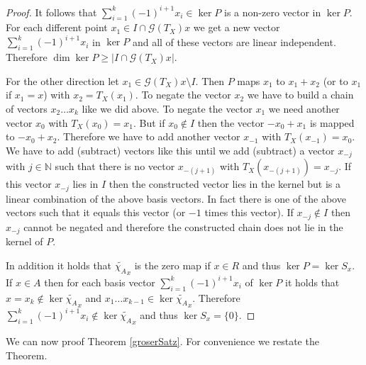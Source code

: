 \documentclass[12pt,a4paper]{scrartcl}
\theoremstyle{plain}
\theoremstyle{definition}
\newcommand{\N}{\mathbb{N}} %
\newcommand{\2}{\mathbb{Z} / 2 \mathbb{Z}}
\newcommand{\G}{\mathcal{G}}
\newcommand{\1}{\bar{1}}
\newcommand{\0}{\bar{0}}
\begin{document}
\begin{proof}
	It follows that $\sum_{i = 1}^{k} (-1)^{i + 1} x_i \in \ker P$ is a non-zero vector in $ \ker P$. For each different point $x_1 \in  I \cap \G (T_X)x$ we get a new vector $\sum_{i = 1}^{k} (-1)^{i + 1} x_i$ in $\ker P$ and all of these vectors are linear independent. Therefore $\dim \ker P \ge |I \cap \G (T_X)x| $.
	
	For the other direction let $x_1 \in \G (T_X)x \setminus I$. Then $P$ maps $x_1$ to $x_1 + x_2$ (or to $x_1$ if $x_1=x$) with $x_2 = T_X(x_1)$. To negate the vector $x_2$  we have to build a chain of vectors $x_2 \ldots x_k$ like we did above. To negate the vector $x_1$ we need another vector $x_0$ with $T_X(x_0) = x_1$. But if $x_0 \notin I$ then the vector $-x_0 + x_1$ is mapped to $-x_0 + x_2$. Therefore we have to add another vector $x_{-1}$ with $T_X(x_{-1}) = x_0$. We have to add (subtract) vectors like this until we add (subtract) a vector $x_{-j}$ with $j \in \N$ such that there is no vector $x_{-(j+1)}$ with $T_X(x_{-(j+1)}) = x_{-j}$. If this vector $x_{-j}$ lies in $I$ then the constructed vector lies in the kernel but is a linear combination of the above basis vectors. In fact there is one of the above vectors such that it equals this vector (or $-1$ times this vector). If $x_{-j} \notin I$ then $x_{-j}$ cannot be negated and therefore the constructed chain does not lie in the kernel of $P$.
	
	
	In addition it holds that $\widetilde{\chi_A}_x$ is the zero map if $x \in R$ and thus $\ker P = \ker S_x$. If $x \in A$ then for each basis vector $\sum_{i = 1}^{k} (-1)^{i + 1} x_i$ of $\ker P$  it holds that $x = x_k \notin \ker \widetilde{\chi_A}_x$ and $x_1 \ldots x_{k - 1} \in \ker \widetilde{\chi_A}_x$. Therefore $\sum_{i = 1}^{k} (-1)^{i + 1} x_i \notin \ker \widetilde{\chi_A}_x$ and thus $\ker S_x = \{0\}$.
\end{proof}
We can now proof Theorem \ref{groserSatz}. For convenience we restate the Theorem.
\groserSatz*
\end{document}
